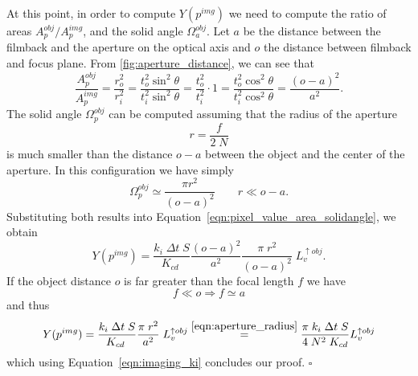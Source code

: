 At this point, in order to compute $Y(p^{img})$ we need to compute the ratio of
areas $A_p^{obj}/A_p^{img}$, and the solid angle $\Omega_a^{obj}$. Let $a$ be the distance between the filmback and the
aperture on the optical axis and $o$ the distance between filmback and focus
plane. From \cref{fig:aperture_distance}, we can see that
\begin{equation*}
    \frac{A_p^{obj}}{A^{img}_p}
    = \frac{r_o^2}{r_i^2}
    = \frac{t_o^2 \sin^2\theta}{t_i^2 \sin^2\theta}
    = \frac{t_o^2}{t_i^2} \cdot 1
    = \frac{t_o^2 \cos^2\theta}{t_i^2 \cos^2\theta}
    = \frac{(o-a)^2}{a^2}.
\end{equation*}
The solid angle $\Omega_p^{obj}$ can be computed assuming that the radius of the
aperture 
\begin{equation}\label{eqn:aperture_radius}
    r = \frac{f}{2\;N}
\end{equation}
is much smaller than the distance $o-a$ between the object
and the center of the aperture. In this configuration we have simply
\begin{equation}\label{eqn:imaging_omegapobj}
\Omega_p^{obj} \simeq \frac{\pi r^2}{(o-a)^2} \qquad r \ll o-a.
\end{equation}
Substituting both results into Equation~\eqref{eqn:pixel_value_area_solidangle}, we obtain
\begin{equation}\label{eqn:imaging_y2}
Y(p^{img}) =  \frac{k_i\; \Delta t \; S}{K_{cd}\;} \frac{(o-a)^2}{a^2} \frac{\pi\;r^2}{(o-a)^2}\; L_v^{\uparrow obj}.
\end{equation}
If the object distance $o$ is far greater than the focal length $f$ we have
\begin{equation}
f \ll o \Rightarrow  f \simeq a
\end{equation}
and thus
\begin{equation}
  Y(p^{img}) =  \frac{k_i\; \Delta t \; S}{K_{cd}\;} \frac{\pi\;r^2}{a^2}\; L_v^{\uparrow obj} \stackrel{\eqref{eqn:aperture_radius}}{=}
   \frac{\pi\; k_i\; \Delta t \; S}{4\;N^2\;K_{cd}} L_v^{\uparrow obj} 
\end{equation}
which using Equation~\eqref{eqn:imaging_ki} concludes our proof. \hfill $\square$

%   

